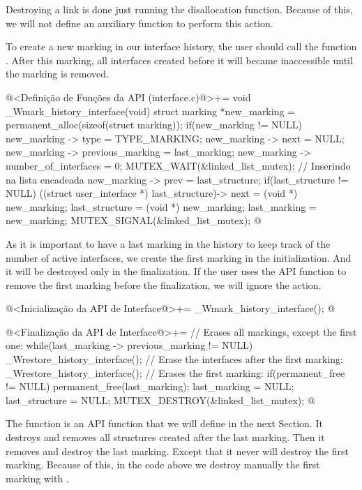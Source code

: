 Destroying a link is done just running the disallocation
function. Because of this, we will not define an auxiliary function to
perform this action.


To create a new marking in our interface history, the user should call
the function . After this
marking, all interfaces created before it will became inaccessible
until the marking is removed.

\iniciocodigo
@<Definição de Funções da API (interface.c)@>+=
void _Wmark_history_interface(void){
  struct marking *new_marking = permanent_alloc(sizeof(struct marking));
  if(new_marking != NULL){
    new_marking -> type = TYPE_MARKING;
    new_marking -> next = NULL;
    new_marking -> previous_marking = last_marking;
    new_marking -> number_of_interfaces = 0;
    MUTEX_WAIT(&linked_list_mutex); // Inserindo na lista encadeada
    new_marking -> prev = last_structure;
    if(last_structure != NULL)
      ((struct user_interface *) last_structure)-> next = (void *) new_marking;
    last_structure = (void *) new_marking;
    last_marking = new_marking;
    MUTEX_SIGNAL(&linked_list_mutex);
  }
}
@
\fimcodigo

As it is important to have a last marking in the history to keep track
of the number of active interfaces, we create the first marking in the
initialization. And it will be destroyed only in the finalization. If
the user uses the API function to remove the first marking before the
finalization, we will ignore the action.

\iniciocodigo
@<Inicialização da API de Interface@>+=
_Wmark_history_interface();
@
\fimcodigo

\iniciocodigo
@<Finalização da API de Interface@>+=
// Erases all markings, except the first one:
while(last_marking -> previous_marking != NULL){
  _Wrestore_history_interface();
}
// Erase the interfaces after the first marking:
_Wrestore_history_interface();
// Erases the first marking:
if(permanent_free != NULL)
  permanent_free(last_marking);
last_marking = NULL;
last_structure = NULL;
MUTEX_DESTROY(&linked_list_mutex);
@
\fimcodigo

The function  is an API
function that we will define in the next Section. It destroys and
removes all structures created after the last marking. Then it removes
and destroy the last marking. Except that it never will destroy the
first marking. Because of this, in the code above we destroy manually
the first marking with .

